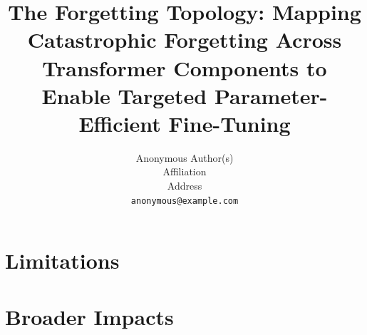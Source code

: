 \documentclass{article}
\title{The Forgetting Topology: Mapping Catastrophic Forgetting Across
Transformer Components to Enable Targeted Parameter-Efficient Fine-Tuning}
\author{%
  Anonymous Author(s) \\
  Affiliation \\
  Address \\
  \texttt{anonymous@example.com}%
}
\begin{document}
\maketitle

\begin{abstract}

\end{abstract}









\section*{Limitations}


\section*{Broader Impacts}





\appendix



\end{document}
